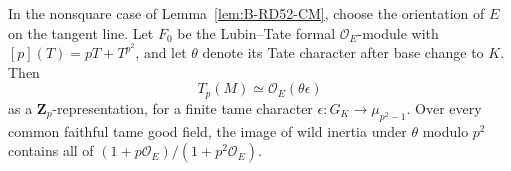 \begin{lemma}
\label{lem:B-RD52-LT}
In the nonsquare case of Lemma~\ref{lem:B-RD52-CM}, choose the
orientation of $E$ on the tangent line. Let $F_0$ be the
Lubin--Tate formal $\mathcal O_E$-module with
$[p](T)=pT+T^{p^2}$, and let $\theta$ denote its Tate
character after base change to $K$. Then
\[
                  T_p(M)\simeq\mathcal O_E(\theta\epsilon)
                                                        \tag{B-RD52.1}
\]
as a $\mathbf Z_p$-representation, for a finite tame character
$\epsilon:G_K\to\mu_{p^2-1}$. Over every common faithful
tame good field, the image of wild inertia under $\theta$
modulo $p^2$ contains all of
$(1+p\mathcal O_E)/(1+p^2\mathcal O_E)$.
\end{lemma}
